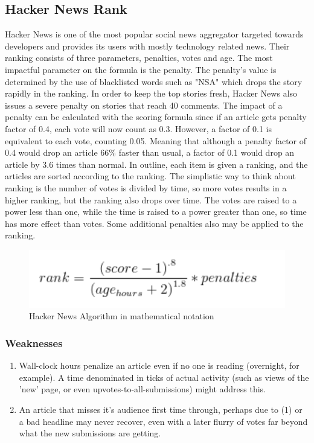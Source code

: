 \subsection{Hacker News Rank}
Hacker News is one of the most popular social news aggregator targeted towards developers and provides its users with mostly technology related news. Their ranking consists of three parameters, penalties, votes and age. The most impactful parameter on the formula is the penalty. The penalty's value is determined by the use of blacklisted words such as "NSA" which drops the story rapidly in the ranking. In order to keep the top stories fresh, Hacker News also issues a severe penalty on stories that reach 40 comments. The impact of a penalty can be calculated with the scoring formula since if an article gets penalty factor of 0.4, each vote will now count as 0.3. However, a factor of 0.1 is equivalent to each vote, counting 0.05. Meaning that although a penalty factor of 0.4 would drop an article 66\% faster than usual, a factor of  0.1 would drop an article by 3.6 times than normal. In outline, each item is given a ranking, and the articles are sorted according to the ranking. The simplistic way to think about ranking is the number of votes is divided by time, so more votes results in a higher ranking, but the ranking also drops over time. The votes are raised to a power less than one, while the time is raised to a power greater than one, so time has more effect than votes. Some additional penalties also may be applied to the ranking.

\begin{figure} [!htb]
  \centering
	\includegraphics{Figures/hacker_news_rank}
\caption{Hacker News Algorithm in mathematical notation}
\end{figure}

\subsubsection {Weaknesses}
\begin{enumerate}
  \item Wall-clock hours penalize an article even if no one is reading (overnight, for example). A time denominated in ticks of actual activity (such as views of the 'new' page, or even upvotes-to-all-submissions) might address this.
  \item An article that misses it's audience first time through, perhaps due to (1) or a bad headline may never recover, even with a later flurry of votes far beyond what the new submissions are getting.
\end{enumerate}

